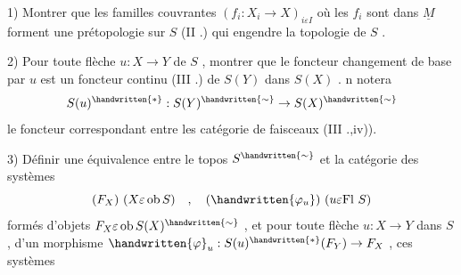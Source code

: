 1) Montrer que les familles couvrantes \((f_i:X_i\to X)_{i\varepsilon I}\) où les \(f_i\) sont dans \(\underline{M}\) forment une prétopologie sur \(S\) (II .) qui engendre la topologie de \(S\) .

2) Pour toute flèche \(u:X\to Y\) de \(S\) , montrer que le foncteur changement de base par \(u\) est un foncteur continu (III .) de \(S(Y)\) dans \(S(X)\) . n notera
\[
S(u)^{\handwritten{*}}:S(Y)^{\handwritten{\sim}}\to S(X)^{\handwritten{\sim}}
\]
le foncteur correspondant entre les catégorie de faisceaux (III .,iv)).

3) Définir une équivalence entre le topos \(S^{\handwritten{\sim}}\) et la catégorie des systèmes
\[
(F_X)\ (X\varepsilon\operatorname{ob}S)\quad,\quad(\handwritten{\varphi_u})\ (u\varepsilon\mathrm{Fl}\ S)
\]
formés d'objets \(F_X\varepsilon\operatorname{ob}S(X)^{\handwritten{\sim}}\) , et pour toute flèche \(u:X\to Y\) dans \(S\) , d'un morphisme \(\handwritten{\varphi}_u:S(u)^{\handwritten{*}}(F_Y)\to F_X\) , ces systèmes
